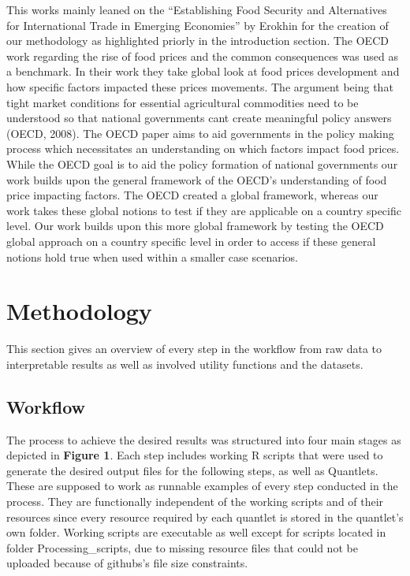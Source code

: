 \documentclass[11pt]{article}
\begin{document}
This works mainly leaned on the “Establishing Food Security and Alternatives for International Trade in Emerging Economies” by Erokhin for the creation of our methodology as highlighted priorly in the introduction section. 
The OECD work regarding the rise of food prices and the common consequences was used as a benchmark. In their work they take global look at food prices development and how specific factors impacted these prices movements. The argument being that tight market conditions for essential agricultural commodities need to be understood so that national governments cant create meaningful policy answers (OECD, 2008). The OECD paper aims to aid governments in the policy making process which necessitates an understanding on which factors impact food prices. While the OECD goal is to aid the  policy formation of national governments our work builds upon the general framework of the OECD’s understanding of food price impacting factors. The OECD created a global framework, whereas our work takes these global notions to test if they are applicable on a country specific level. Our work builds upon this more global framework by testing the OECD global approach on a country specific level in order to access if these general notions hold true when used within a smaller case scenarios.


\section{Methodology}

This section gives an overview of every step in the workflow from raw data to interpretable results as well as involved utility functions and the datasets.

\subsection{Workflow}

The process to achieve the desired results was structured into four main stages as depicted in \textbf{Figure 1}. Each step includes working R scripts that were used to generate the desired output files for the following steps, as well as Quantlets. These are supposed to work as runnable examples of every step conducted in the process. They are functionally independent of the working scripts and of their resources since every resource required by each quantlet is stored in the quantlet’s own folder.
Working scripts are executable as well except for scripts located in folder Processing\_scripts, due to missing resource files that could not be uploaded because of githubs’s file size constraints.
\end{document}
